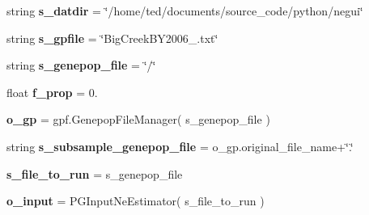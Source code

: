 \begin{DoxyCompactItemize}
\item 
string {\bfseries s\+\_\+datdir} = \char`\"{}/home/ted/documents/source\+\_\+code/python/negui\char`\"{}\hypertarget{namespacenegui_1_1pgopneestimator_a5cf5f61553ac8e1d36bdbf79a2e8e13f}{}\label{namespacenegui_1_1pgopneestimator_a5cf5f61553ac8e1d36bdbf79a2e8e13f}

\item 
string {\bfseries s\+\_\+gpfile} = \char`\"{}Big\+Creek\+B\+Y2006\+\_.\+txt\char`\"{}\hypertarget{namespacenegui_1_1pgopneestimator_a2b78915eeca155a1680e89e1fe0d7898}{}\label{namespacenegui_1_1pgopneestimator_a2b78915eeca155a1680e89e1fe0d7898}

\item 
string {\bfseries s\+\_\+genepop\+\_\+file} = \char`\"{}/\char`\"{}\hypertarget{namespacenegui_1_1pgopneestimator_abd2f865b6c90be20725b38a3f9abe0d6}{}\label{namespacenegui_1_1pgopneestimator_abd2f865b6c90be20725b38a3f9abe0d6}

\item 
float {\bfseries f\+\_\+prop} = 0.\hypertarget{namespacenegui_1_1pgopneestimator_adbcd497fa5f921163432c42451b40caf}{}\label{namespacenegui_1_1pgopneestimator_adbcd497fa5f921163432c42451b40caf}

\item 
{\bfseries o\+\_\+gp} = gpf.\+Genepop\+File\+Manager( s\+\_\+genepop\+\_\+file )\hypertarget{namespacenegui_1_1pgopneestimator_a2a15c53902b0cf304fbbcd7cca8c422a}{}\label{namespacenegui_1_1pgopneestimator_a2a15c53902b0cf304fbbcd7cca8c422a}

\item 
string {\bfseries s\+\_\+subsample\+\_\+genepop\+\_\+file} = o\+\_\+gp.\+original\+\_\+file\+\_\+name+\char`\"{}.\char`\"{}\hypertarget{namespacenegui_1_1pgopneestimator_a2dc7d11211bb2787bba6428bf2297d24}{}\label{namespacenegui_1_1pgopneestimator_a2dc7d11211bb2787bba6428bf2297d24}

\item 
{\bfseries s\+\_\+file\+\_\+to\+\_\+run} = s\+\_\+genepop\+\_\+file\hypertarget{namespacenegui_1_1pgopneestimator_a5bac9bb118c3ddb4f9b5457a924834d5}{}\label{namespacenegui_1_1pgopneestimator_a5bac9bb118c3ddb4f9b5457a924834d5}

\item 
{\bfseries o\+\_\+input} = P\+G\+Input\+Ne\+Estimator( s\+\_\+file\+\_\+to\+\_\+run )\hypertarget{namespacenegui_1_1pgopneestimator_a4d3e68431275c1b44d4675fd5830cc5d}{}\label{namespacenegui_1_1pgopneestimator_a4d3e68431275c1b44d4675fd5830cc5d}


\end{DoxyCompactItemize}
